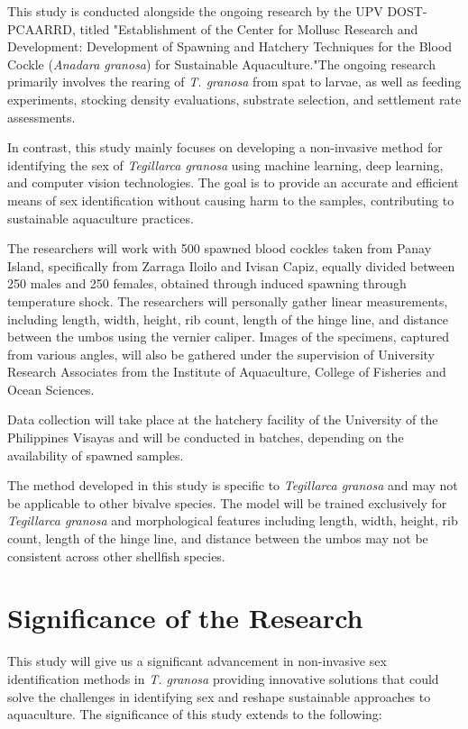 This study is conducted alongside the ongoing research by the UPV DOST-PCAARRD, titled "Establishment of the Center for Mollusc Research and Development: Development of Spawning and Hatchery Techniques for the Blood Cockle (\textit{Anadara granosa}) for Sustainable Aquaculture."The ongoing research primarily involves the rearing of \textit{T. granosa} from spat to larvae, as well as feeding experiments, stocking density evaluations, substrate selection, and settlement rate assessments.

In contrast, this study mainly focuses on developing a non-invasive method for identifying the sex of \textit{Tegillarca granosa} using machine learning, deep learning, and computer vision technologies. The goal is to provide an accurate and efficient means of sex identification without causing harm to the samples, contributing to sustainable aquaculture practices.

The researchers will work with 500 spawned blood cockles taken from Panay Island, specifically from Zarraga Iloilo and Ivisan Capiz, equally divided between 250 males and 250 females, obtained through induced spawning through temperature shock. The researchers will personally gather linear measurements, including length, width, height, rib count, length of the hinge line, and distance between the umbos using the vernier caliper. Images of the specimens, captured from various angles, will also be gathered under the supervision of University Research Associates from the Institute of Aquaculture, College of Fisheries and Ocean Sciences.

Data collection will take place at the hatchery facility of the University of the Philippines Visayas and will be conducted in batches, depending on the availability of spawned samples.

The method developed in this study is specific to \textit{Tegillarca granosa} and may not be applicable to other bivalve species. The model will be trained exclusively for \textit{Tegillarca granosa} and morphological features including length, width, height, rib count, length of the hinge line, and distance between the umbos may not be consistent across other shellfish species. 

\section{Significance of the Research}
\label{sec:significance}

This study will give us a significant advancement in non-invasive sex identification methods in \textit{T. granosa} providing innovative solutions that could solve the challenges in identifying sex and reshape sustainable approaches to aquaculture. The significance of this study extends to the following:

